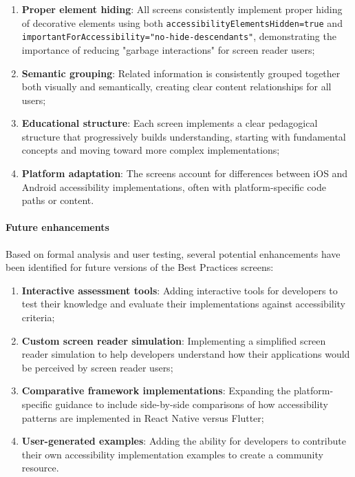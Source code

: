 \begin{enumerate}
    \item \textbf{Proper element hiding}: All screens consistently implement proper hiding of decorative elements using both \texttt{accessibilityElementsHidden=true} and \\\texttt{importantForAccessibility="no-hide-descendants"}, demonstrating the importance of reducing "garbage interactions" for screen reader users;
    
    \item \textbf{Semantic grouping}: Related information is consistently grouped together both visually and semantically, creating clear content relationships for all users;
    
    \item \textbf{Educational structure}: Each screen implements a clear pedagogical structure that progressively builds understanding, starting with fundamental concepts and moving toward more complex implementations;
    
    \item \textbf{Platform adaptation}: The screens account for differences between iOS and Android accessibility implementations, often with platform-specific code paths or content.
\end{enumerate}

\paragraph{Future enhancements}

Based on formal analysis and user testing, several potential enhancements have been identified for future versions of the Best Practices screens:

\begin{enumerate}
    \item \textbf{Interactive assessment tools}: Adding interactive tools for developers to test their knowledge and evaluate their implementations against accessibility criteria;
    
    \item \textbf{Custom screen reader simulation}: Implementing a simplified screen reader simulation to help developers understand how their applications would be perceived by screen reader users;
    
    \item \textbf{Comparative framework implementations}: Expanding the platform-specific guidance to include side-by-side comparisons of how accessibility patterns are implemented in React Native versus Flutter;
    
    \item \textbf{User-generated examples}: Adding the ability for developers to contribute their own accessibility implementation examples to create a community resource.
\end{enumerate}

